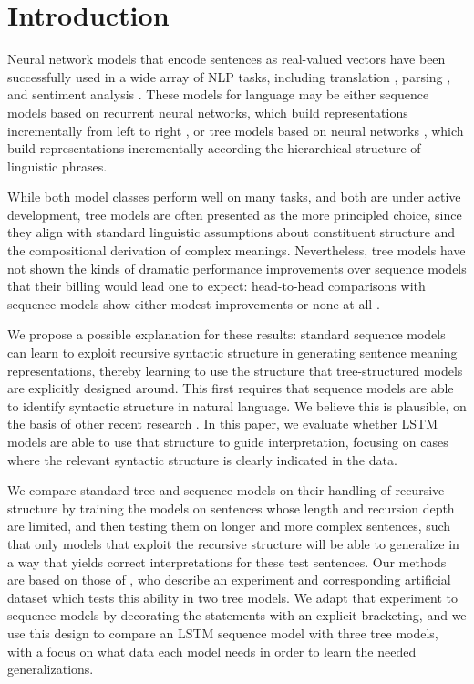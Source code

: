 \section{Introduction}\label{sec:intro}

Neural network models that encode sentences as real-valued vectors have been successfully used in a wide array of NLP tasks, including translation \cite{sutskever2014sequence}, parsing \cite{dyer2015transition}, and sentiment analysis \cite{tai2015improved}. 
These models for language may be either 
sequence models based on recurrent neural networks, which build representations incrementally from left to right \cite{elman1990finding,sutskever2014sequence}, or tree models based on  neural networks \cite{goller1996learning,socher2011semi}, which build representations incrementally according the hierarchical structure of linguistic phrases. 


While both model classes perform %
well on many tasks, and both are under active development,
tree models are often presented as the more principled choice, since they align with standard linguistic assumptions about constituent structure and the compositional derivation of complex meanings.
Nevertheless,
tree models have not shown the kinds of dramatic performance improvements over sequence models that their billing would lead one to expect: head-to-head comparisons with sequence models show either modest improvements \cite{tai2015improved} or none at all \cite{li2015tree}. 

We propose a possible explanation for these results: standard sequence models can learn to
exploit recursive syntactic structure in generating sentence meaning representations, thereby 
learning to use the 
structure that tree-structured models are explicitly designed around. This first requires that
sequence models are able to identify syntactic structure in natural language. We believe this is plausible, on the basis of other recent research \cite{Karpathy2015vaurn}. %
In this paper, we  evaluate whether LSTM models are able to use that structure to guide interpretation, 
focusing on cases where the relevant syntactic structure is clearly indicated in the data.

We compare standard tree and sequence models on their handling of recursive structure by training the models on sentences whose length and recursion depth are limited, and then testing them on longer and more complex sentences, such that only models that exploit the recursive structure will be able to generalize in a way that yields correct interpretations for these test sentences. Our methods are based on those of , who describe an experiment and corresponding artificial dataset which tests this ability in two tree models. We adapt that experiment to sequence models by decorating the statements with an explicit bracketing, and we use this design to compare an LSTM sequence model with three tree models, with a focus on what data each model needs in order to learn the needed generalizations.

